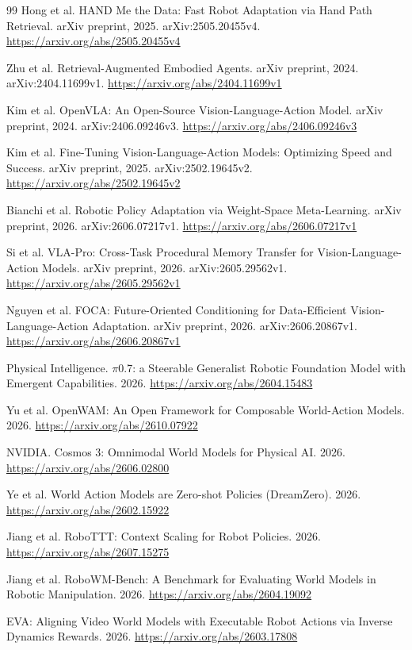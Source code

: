 \documentclass[11pt,a4paper]{article}
\begin{document}
\begin{thebibliography}{99}
Hong et al. HAND Me the Data: Fast Robot Adaptation via Hand Path Retrieval. arXiv preprint, 2025. arXiv:2505.20455v4. \url{https://arxiv.org/abs/2505.20455v4}

Zhu et al. Retrieval-Augmented Embodied Agents. arXiv preprint, 2024. arXiv:2404.11699v1. \url{https://arxiv.org/abs/2404.11699v1}

Kim et al. OpenVLA: An Open-Source Vision-Language-Action Model. arXiv preprint, 2024. arXiv:2406.09246v3. \url{https://arxiv.org/abs/2406.09246v3}

Kim et al. Fine-Tuning Vision-Language-Action Models: Optimizing Speed and Success. arXiv preprint, 2025. arXiv:2502.19645v2. \url{https://arxiv.org/abs/2502.19645v2}

Bianchi et al. Robotic Policy Adaptation via Weight-Space Meta-Learning. arXiv preprint, 2026. arXiv:2606.07217v1. \url{https://arxiv.org/abs/2606.07217v1}

Si et al. VLA-Pro: Cross-Task Procedural Memory Transfer for Vision-Language-Action Models. arXiv preprint, 2026. arXiv:2605.29562v1. \url{https://arxiv.org/abs/2605.29562v1}

Nguyen et al. FOCA: Future-Oriented Conditioning for Data-Efficient Vision-Language-Action Adaptation. arXiv preprint, 2026. arXiv:2606.20867v1. \url{https://arxiv.org/abs/2606.20867v1}

Physical Intelligence. \(\pi\)0.7: a Steerable Generalist Robotic Foundation Model with Emergent Capabilities. 2026. \url{https://arxiv.org/abs/2604.15483}

Yu et al. OpenWAM: An Open Framework for Composable World-Action Models. 2026. \url{https://arxiv.org/abs/2610.07922}

NVIDIA. Cosmos 3: Omnimodal World Models for Physical AI. 2026. \url{https://arxiv.org/abs/2606.02800}

Ye et al. World Action Models are Zero-shot Policies (DreamZero). 2026. \url{https://arxiv.org/abs/2602.15922}

Jiang et al. RoboTTT: Context Scaling for Robot Policies. 2026. \url{https://arxiv.org/abs/2607.15275}

Jiang et al. RoboWM-Bench: A Benchmark for Evaluating World Models in Robotic Manipulation. 2026. \url{https://arxiv.org/abs/2604.19092}

EVA: Aligning Video World Models with Executable Robot Actions via Inverse Dynamics Rewards. 2026. \url{https://arxiv.org/abs/2603.17808}


\end{thebibliography}
\end{document}
